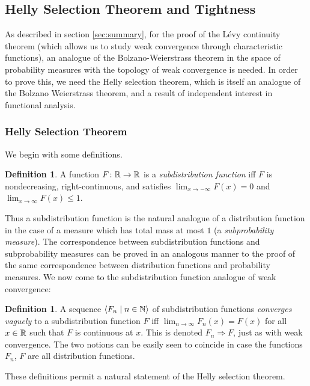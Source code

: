 \documentclass[leqno]{article}
\theoremstyle{definition}
\newtheorem{definition}[theorem]{Definition}
\newcommand{\bldseq}[2]{\langle{#1}\mid{#2}\rangle}
\begin{document}
\subsection{Helly Selection Theorem and Tightness} \label{sec:helly}

As described in section \ref{sec:summary}, for the proof of the L\'evy continuity theorem (which allows us to study weak convergence through characteristic functions), an analogue of the Bolzano-Weierstrass theorem in the space of probability measures with the topology of weak convergence is needed. In order to prove this, we need the Helly selection theorem, which is itself an analogue of the Bolzano Weierstrass theorem, and a result of independent interest in functional analysis.

\subsubsection{Helly Selection Theorem}

We begin with some definitions.

\begin{definition} \label{def:subdist}
A function $F\colon \mathbb{R} \rightarrow \mathbb{R}$ is a {\em subdistribution function} iff $F$ is nondecreasing, right-continuous, and satisfies $\lim_{x \rightarrow -\infty} F(x) = 0$ and $\lim_{x \rightarrow \infty} F(x) \le 1$.
\end{definition}

Thus a subdistribution function is the natural analogue of a distribution function in the case of a measure which has total mass at most $1$ (a {\em subprobability measure}). The correspondence between subdistribution functions and subprobability measures can be proved in an analogous manner to the proof of the same correspondence between distribution functions and probability measures. We now come to the subdistribution function analogue of weak convergence:

\begin{definition} \label{def:vague}
A sequence $\bldseq{F_n}{n \in \N}$ of subdistribution functions {\em converges vaguely} to a subdistribution function $F$ iff $\lim_{n \rightarrow \infty} F_n(x) = F(x)$ for all $x \in \mathbb{R}$ such that $F$ is continuous at $x$. This is denoted $F_n \Rightarrow F$, just as with weak convergence. The two notions can be easily seen to coincide in case the functions $F_n$, $F$ are all distribution functions.
\end{definition}

These definitions permit a natural statement of the Helly selection theorem.
\end{document}
